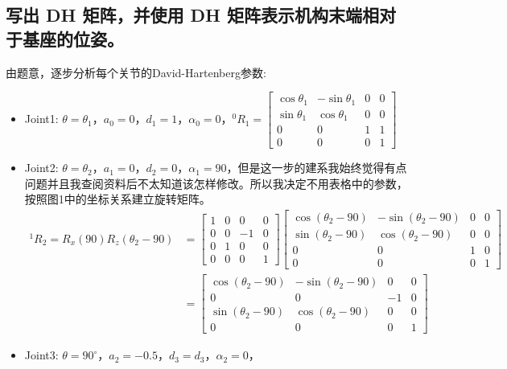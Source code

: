 \documentclass{ctexart}
\begin{document}
\subsection{写出 DH 矩阵，并使用 DH 矩阵表示机构末端相对于基座的位姿。}
由题意，逐步分析每个关节的David-Hartenberg参数:
\begin{itemize}
	\item Joint1: $\theta = \theta_1$，$a_0=0$，$d_1=1$，$\alpha_0=0$，$^0R_1=\begin{bmatrix}
		\cos\theta_1 & -\sin\theta_1 & 0 & 0 \\
		\sin\theta_1 & \cos\theta_1 & 0 & 0 \\
		0 & 0 & 1 & 1 \\
		0 & 0 & 0 & 1
	\end{bmatrix}$

	\item Joint2: $\theta = \theta_2$，$a_1=0$，$d_2=0$，$\alpha_1=90$，但是这一步的建系我始终觉得有点问题并且我查阅资料后不太知道该怎样修改。所以我决定不用表格中的参数，按照图1中的坐标关系建立旋转矩阵。
	\begin{equation}
		\begin{aligned}
		^1R_2=R_x(90)R_z(\theta_2-90)&=\begin{bmatrix}
			1 & 0 & 0 & 0 \\
			0 & 0 & -1 & 0 \\
			0 & 1 & 0 & 0 \\
			0 & 0 & 0 & 1
		\end{bmatrix}\begin{bmatrix}
			\cos(\theta_2-90) & -\sin(\theta_2-90) & 0 & 0 \\
			\sin(\theta_2-90) & \cos(\theta_2-90) & 0 & 0 \\
			0 & 0 & 1 & 0 \\
			0 & 0 & 0 & 1
		\end{bmatrix}
		\\&=
		\begin{bmatrix}
			\cos(\theta_2-90) & -\sin(\theta_2-90) & 0 & 0 \\
			0 & 0 & -1 & 0 \\
			\sin(\theta_2-90) & \cos(\theta_2-90) & 0 & 0 \\
			0 & 0 & 0 & 1
		\end{bmatrix}
	\end{aligned}
	\end{equation}
	\item Joint3: $\theta=90^\circ$，$a_2=-0.5$，$d_3=d_3$，$\alpha_2=0$，
	\begin{equation}

\end{equation}
\end{itemize}
\end{document}
